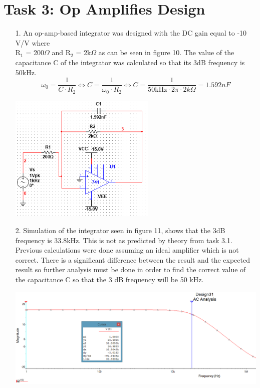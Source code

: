 \documentclass[11pt,a4paper]{article}
\begin{document}
\section*{Task 3: Op Amplifies Design}

\begin{enumerate}
  \item[1.]
  An op-amp-based integrator was designed with the DC gain equal to -10 V/V where \\R$_1$ = 200$\Omega$ and R$_2$ = 2k$\Omega$ as can be seen in figure 10. The value of the capacitance C of the integrator was calculated so that its 3dB frequency is 50kHz. %
$$\omega_0 = \frac{1}{C\cdot R_2} \Leftrightarrow C = \frac{1}{\omega_0 \cdot R_2} \Leftrightarrow C  = \frac{1}{50\text{kHz}\cdot 2\pi \cdot 2k\Omega} = 1.592 nF $$
  \begin{minipage}{\linewidth}
    	\centering       
        \includegraphics[width=7cm]{Task3_1.png}
    \end{minipage}
  \item[2.]
  Simulation of the integrator seen in figure 11, shows that the 3dB frequency is 33.8kHz. This is not as predicted by theory from task 3.1. Previous calculations were done assuming an ideal amplifier which is not correct. There is a significant difference between the result and the expected result so further analysis must be done in order to find the correct value of the capacitance C so that the 3 dB frequency will be 50 kHz.\\
  \begin{minipage}{\linewidth}
    	\centering       
        \includegraphics[width=14cm]{Task3_2.png}

\end{minipage}
\end{enumerate}
\end{document}
